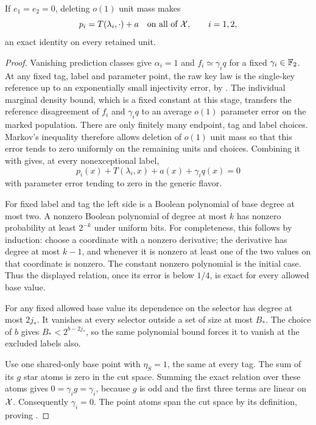 \begin{lemma}
\label{lem:empty-status}
If \(e_1=e_2=0\), deleting \(o(1)\) unit mass makes
\begin{equation}
 p_i=T(\lambda_i,\cdot)+a
 \quad\text{on all of }\mathcal X,\qquad i=1,2,
 \label{eq:exact-prediction}
\end{equation}
an exact identity on every retained unit.
\end{lemma}

\begin{proof}
Vanishing prediction classes give \(\alpha_i=1\) and
\(f_i\simeq\gamma_iq\) for a fixed \(\gamma_i\in\mathbb F_2\).
At any fixed tag, label and parameter point, the raw key law
is the single-key reference up to an exponentially small
injectivity error, by .
The individual marginal density bound, which is a fixed
constant at this stage, transfers the reference disagreement
of \(f_i\) and \(\gamma_iq\) to an average \(o(1)\) parameter
error on the marked population.
There are only finitely many endpoint, tag and label choices.
Markov's inequality therefore allows deletion of \(o(1)\)
unit mass so that this error tends to zero uniformly on
the remaining units and choices.
Combining it with  gives, at every
nonexceptional label,
\[
 p_i(x)+T(\lambda_i,x)+a(x)+\gamma_iq(x)=0
\]
with parameter error tending to zero in the generic flavor.

For fixed label and tag the left side is a Boolean polynomial
of base degree at most two.  A nonzero Boolean polynomial of
degree at most \(k\) has nonzero probability at least \(2^{-k}\)
under uniform bits.  For completeness, this follows by induction:
choose a coordinate with a nonzero derivative; the derivative
has degree at most \(k-1\), and whenever it is nonzero at least
one of the two values on that coordinate is nonzero.
The constant nonzero polynomial is the initial case.
Thus the displayed relation, once its error is below \(1/4\),
is exact for every allowed base value.

For any fixed allowed base value its dependence on the selector
has degree at most \(2j_*\).  It vanishes at every selector
outside a set of size at most \(B_*\).
The choice of \(b\) gives
\(B_*<2^{b-2j_*}\), so the same polynomial bound forces it
to vanish at the excluded labels also.

Use one shared-only base point with \(\eta_S=1\), the same at
every tag.  The sum of its \(g\) star atoms is zero in the cut
space.  Summing the exact relation over these atoms gives
\(0=\gamma_i g=\gamma_i\), because \(g\) is odd and
the first three terms are linear on \(\mathcal X\).
Consequently \(\gamma_i=0\).
The point atoms span the cut space by its definition, proving
.
\end{proof}

